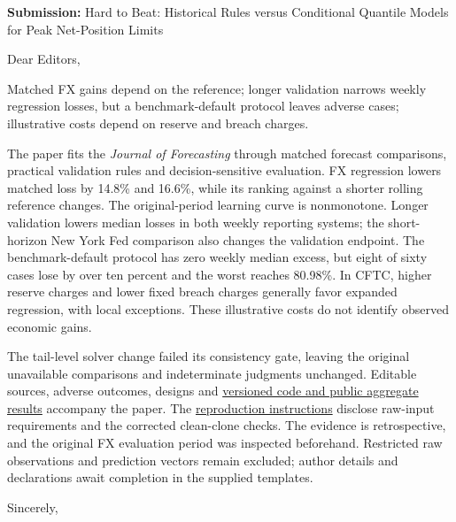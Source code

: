 \documentclass[11pt,a4paper]{article}
\begin{document}
\textbf{Submission:} Hard to Beat: Historical Rules versus Conditional Quantile Models for Peak Net-Position Limits

Dear Editors,

Matched FX gains depend on the reference; longer validation narrows weekly regression losses, but a benchmark-default protocol leaves adverse cases; illustrative costs depend on reserve and breach charges.

The paper fits the \emph{Journal of Forecasting} through matched forecast comparisons, practical validation rules and decision-sensitive evaluation. FX regression lowers matched loss by 14.8\% and 16.6\%, while its ranking against a shorter rolling reference changes. The original-period learning curve is nonmonotone. Longer validation lowers median losses in both weekly reporting systems; the short-horizon New York Fed comparison also changes the validation endpoint. The benchmark-default protocol has zero weekly median excess, but eight of sixty cases lose by over ten percent and the worst reaches 80.98\%. In CFTC, higher reserve charges and lower fixed breach charges generally favor expanded regression, with local exceptions. These illustrative costs do not identify observed economic gains.

The tail-level solver change failed its consistency gate, leaving the original unavailable comparisons and indeterminate judgments unchanged. Editable sources, adverse outcomes, designs and \href{https://github.com/ByronLi0207/financial-mathematics-paper-20261020/tree/revision-v13}{versioned code and public aggregate results} accompany the paper. The \href{https://github.com/ByronLi0207/financial-mathematics-paper-20261020/blob/revision-v13/REPRODUCING.md}{reproduction instructions} disclose raw-input requirements and the corrected clean-clone checks. The evidence is retrospective, and the original FX evaluation period was inspected beforehand. Restricted raw observations and prediction vectors remain excluded; author details and declarations await completion in the supplied templates.

Sincerely,\par [TO BE COMPLETED BY AUTHOR]
\end{document}
